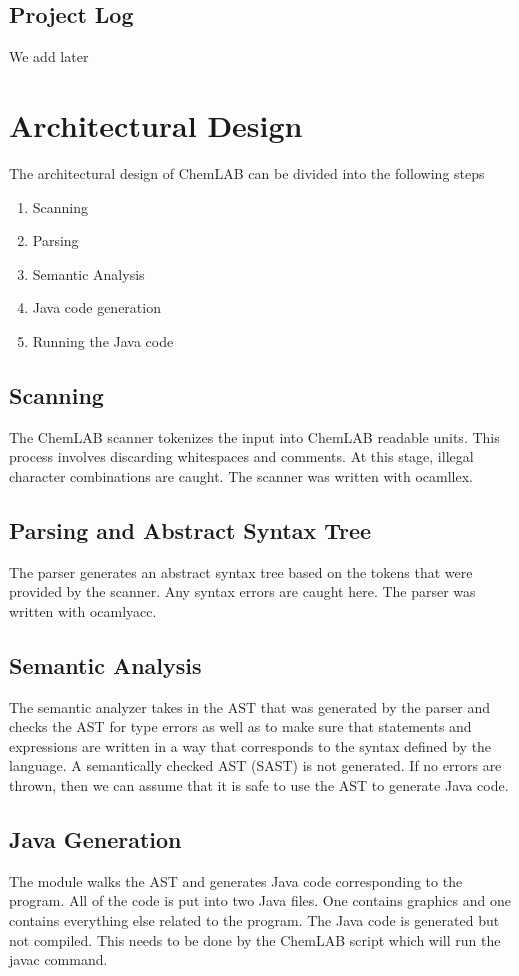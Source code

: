 \documentclass[11pt]{report}
\begin{document}
\section{Project Log}
We add later 

\chapter{Architectural Design}
The architectural design of ChemLAB can be divided into the following steps
\begin{enumerate}
	\item Scanning
	\item Parsing
	\item Semantic Analysis
	\item Java code generation
	\item Running the Java code
\end{enumerate}

\section{Scanning}
The ChemLAB scanner tokenizes the input into ChemLAB readable units. This process involves discarding whitespaces and comments. At this stage, illegal character combinations are caught. The scanner was written with ocamllex. 

\section{Parsing and Abstract Syntax Tree}
The parser generates an abstract syntax tree based on the tokens that were provided by the scanner. Any syntax errors are caught here. The parser was written with ocamlyacc. 

\section{Semantic Analysis}
The semantic analyzer takes in the AST that was generated by the parser and checks the AST for type errors as well as to make sure that statements and expressions are written in a way that corresponds to the syntax defined by the language. A semantically checked AST (SAST) is not generated. If no errors are thrown, then we can assume that it is safe to use the AST to generate Java code. 

\section{Java Generation}
The module walks the AST and generates Java code corresponding to the program. All of the code is put into two Java files. One contains graphics and one contains everything else related to the program. The Java code is generated but not compiled. This needs to be done by the ChemLAB script which will run the javac command. 
\end{document}
